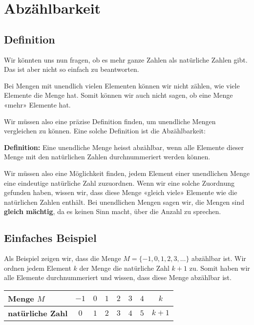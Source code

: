 \newpage
\section{Abzählbarkeit}

\subsection{Definition}


Wir könnten uns nun fragen, ob es mehr ganze Zahlen als natürliche Zahlen gibt. Das ist aber nicht so einfach zu beantworten.

Bei Mengen mit unendlich vielen Elementen können wir nicht zählen, wie viele Elemente die Menge hat. Somit können wir auch nicht sagen, ob eine Menge «mehr» Elemente hat.

Wir müssen also eine präzise Definition finden, um unendliche Mengen vergleichen zu können. Eine solche Definition ist die Abzählbarkeit:

\textbf{Definition:} Eine unendliche Menge heisst abzählbar, wenn alle Elemente dieser Menge mit den natürlichen Zahlen durchnummeriert werden können.

Wir müssen also eine Möglichkeit finden, jedem Element einer unendlichen Menge eine eindeutige natürliche Zahl zuzuordnen. Wenn wir eine solche Zuordnung gefunden haben, wissen wir, dass diese Menge «gleich viele» Elemente wie die natürlichen Zahlen enthält. Bei unendlichen Mengen sagen wir, die Mengen sind \textbf{gleich mächtig}, da es keinen Sinn macht, über die Anzahl zu sprechen.

\subsection{Einfaches Beispiel}

Als Beispiel zeigen wir, dass die Menge $M = \{-1, 0, 1, 2, 3, \ldots\}$ abzählbar ist. Wir ordnen jedem Element $k$ der Menge die natürliche Zahl $k+1$ zu. Somit haben wir alle Elemente durchnummeriert und wissen, dass diese Menge abzählbar ist.

\begin{center}
  \renewcommand{\arraystretch}{1.3}
  \begin{tabularx}{\textwidth}{|l|C|C|C|C|C|C|C|}
  \hline
    \textbf{Menge $M$}       & $-1$ & $0$ & $1$ & $2$ & $3$ & $4$ & $k$ \\
  \hline
    \textbf{natürliche Zahl} & $0$ &  $1$ & $2$ & $3$ & $4$ & $5$ & $k+1$ \\
  \hline
  \end{tabularx}
\end{center}


